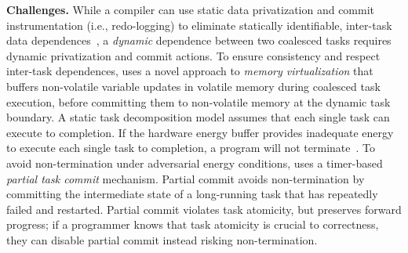 \textbf{Challenges.} While a compiler can use static data privatization and commit instrumentation
(i.e., redo-logging) to eliminate statically identifiable, inter-task data
dependences~\citep{alpaca}, a \emph{dynamic} dependence between two coalesced
tasks requires dynamic privatization and commit actions. 
%
To ensure consistency and respect inter-task dependences, \sys uses a novel
approach to \emph{memory virtualization} that buffers non-volatile variable
updates in volatile memory during coalesced task execution, before committing
them to non-volatile memory at the dynamic task boundary.
%
A static task decomposition model assumes that each
single task can execute to completion.  If the hardware energy buffer provides
inadequate energy to execute each single task to completion, a program will not
terminate~\cite{cleancut_2018}. To avoid non-termination under adversarial 
energy conditions, \sys uses a timer-based {\em partial task commit} mechanism.
Partial commit avoids non-termination by committing the intermediate state of a long-running
task that has repeatedly failed and restarted.  Partial commit violates
task atomicity, but preserves forward progress; if a programmer knows that
task atomicity is crucial to correctness, they can disable partial commit
instead risking non-termination.

%

